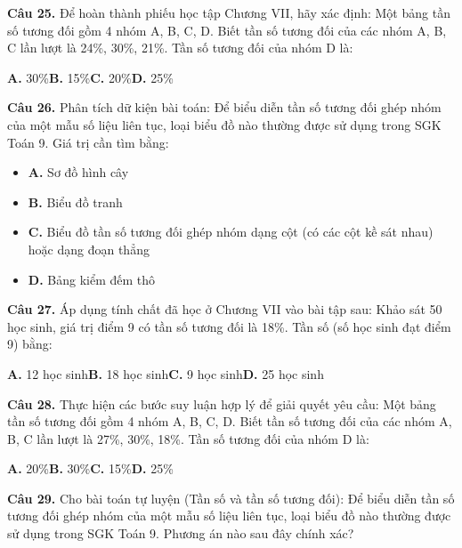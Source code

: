 \documentclass[11pt,a4paper]{article}
\begin{document}
\textbf{\color{primary} Câu 25.} Để hoàn thành phiếu học tập Chương VII, hãy xác định: Một bảng tần số tương đối gồm 4 nhóm A, B, C, D. Biết tần số tương đối của các nhóm A, B, C lần lượt là 24\%, 30\%, 21\%. Tần số tương đối của nhóm D là:\par
\hspace*{1.5em}\textbf{A.} 30\%\quad\quad \textbf{B.} 15\%\quad\quad \textbf{C.} 20\%\quad\quad \textbf{D.} 25\%\par\vspace{2pt}
\textbf{\color{primary} Câu 26.} Phân tích dữ kiện bài toán: Để biểu diễn tần số tương đối ghép nhóm của một mẫu số liệu liên tục, loại biểu đồ nào thường được sử dụng trong SGK Toán 9. Giá trị cần tìm bằng:\par
\begin{itemize}\setlength{\itemsep}{1pt}\setlength{\parskip}{0pt}
  \item[] \textbf{A.} Sơ đồ hình cây
  \item[] \textbf{B.} Biểu đồ tranh
  \item[] \textbf{C.} Biểu đồ tần số tương đối ghép nhóm dạng cột (có các cột kề sát nhau) hoặc dạng đoạn thẳng
  \item[] \textbf{D.} Bảng kiểm đếm thô
\end{itemize}\vspace{2pt}
\textbf{\color{primary} Câu 27.} Áp dụng tính chất đã học ở Chương VII vào bài tập sau: Khảo sát 50 học sinh, giá trị điểm 9 có tần số tương đối là 18\%. Tần số (số học sinh đạt điểm 9) bằng:\par
\hspace*{1.5em}\textbf{A.} 12 học sinh\quad\quad \textbf{B.} 18 học sinh\quad\quad \textbf{C.} 9 học sinh\quad\quad \textbf{D.} 25 học sinh\par\vspace{2pt}
\textbf{\color{primary} Câu 28.} Thực hiện các bước suy luận hợp lý để giải quyết yêu cầu: Một bảng tần số tương đối gồm 4 nhóm A, B, C, D. Biết tần số tương đối của các nhóm A, B, C lần lượt là 27\%, 30\%, 18\%. Tần số tương đối của nhóm D là:\par
\hspace*{1.5em}\textbf{A.} 20\%\quad\quad \textbf{B.} 30\%\quad\quad \textbf{C.} 15\%\quad\quad \textbf{D.} 25\%\par\vspace{2pt}
\textbf{\color{primary} Câu 29.} Cho bài toán tự luyện (Tần số và tần số tương đối): Để biểu diễn tần số tương đối ghép nhóm của một mẫu số liệu liên tục, loại biểu đồ nào thường được sử dụng trong SGK Toán 9. Phương án nào sau đây chính xác?\par
\end{document}
